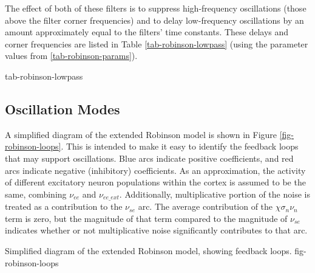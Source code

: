 The effect of both of these filters is to suppress high-frequency
oscillations (those above the filter corner frequencies) and to delay
low-frequency oscillations by an amount approximately equal to the filters'
time constants. These delays and corner frequencies are listed in Table
\ref{tab-robinson-lowpass} (using the parameter values from
\ref{tab-robinson-params}).

{tab-robinson-lowpass}

%
%
\subsection{Oscillation Modes}
\label{sect-robinson-math-modes}

A simplified diagram of the extended Robinson model is shown in Figure
\ref{fig-robinson-loops}. This is intended to make it easy to identify the
feedback loops that may support oscillations. Blue arcs indicate positive
coefficients, and red arcs indicate negative (inhibitory) coefficients.
As an approximation, the activity of different excitatory neuron populations
within the cortex is assumed to be the same, combining $\nu_{ee}$ and
$\nu_{ee\_ext}$. Additionally, multiplicative portion of the noise is
treated as a contribution to the $\nu_{se}$ arc. The average contribution of
the $\chi \sigma_n \nu_n$ term is zero, but the magnitude of that term
compared to the magnitude of $\nu_{se}$ indicates whether or not
multiplicative noise significantly contributes to that arc.

{Simplified diagram of the extended Robinson model, showing feedback loops.}
{fig-robinson-loops}

